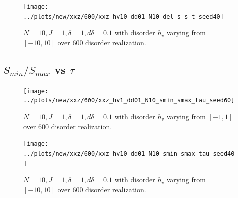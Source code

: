 \documentclass[a4paper]{article}
\begin{document}
\begin{figure}[h!]
  \centering
  \texttt{[image: ../plots/new/xxz/600/xxz\_hv10\_dd01\_N10\_del\_s\_s\_t\_seed40]}
  \caption{$N = 10, J = 1, \delta = 1, d \delta =0.1$ with disorder $h_v$ varying from $[-10,10]$ over 600 disorder realization.}
  \label{fig:}
\end{figure}


\clearpage
\subsection{$S_{min}/S_{max}$ vs $\tau$}
\begin{figure}[h!]
  \centering
  \texttt{[image: ../plots/new/xxz/600/xxz\_hv1\_dd01\_N10\_smin\_smax\_tau\_seed60]}
  \caption{$N = 10, J = 1, \delta = 1, d \delta =0.1$ with disorder $h_v$ varying from $[-1,1]$ over 600 disorder realization.}
  \label{fig:}
\end{figure}

\begin{figure}[h!]
  \centering
  \texttt{[image: ../plots/new/xxz/600/xxz\_hv10\_dd01\_N10\_smin\_smax\_tau\_seed40]}
  \caption{$N = 10, J = 1, \delta = 1, d \delta =0.1$ with disorder $h_v$ varying from $[-10,10]$ over 600 disorder realization.}
  \label{fig:}
\end{figure}
\end{document}
